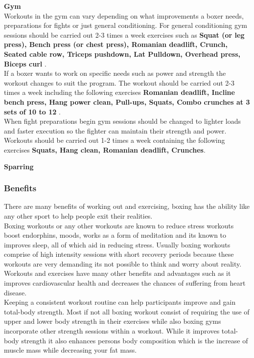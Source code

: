 \documentclass[a4paper,12pt,twoside]{report}
\begin{document}
\textbf{Gym}\\
Workouts in the gym can vary depending on what improvements a boxer needs, preparations for fights or just general conditioning.
For general conditioning gym sessions should be carried out 2-3 times a week exercises such as 
   \textbf{Squat (or leg press), Bench press (or chest press), Romanian deadlift, Crunch, Seated cable row, Triceps pushdown, Lat Pulldown, Overhead press, Biceps curl
 }.\\
If a boxer wants to work on specific needs such as power and strength the workout changes to suit the program.
The workout should be carried out 2-3 times a week including the following exercises \textbf{Romanian deadlift, Incline bench press, Hang power clean, Pull-ups, Squats, Combo crunches at 3 sets of 10 to 12
}.\\
When fight preparations begin gym sessions should be changed to lighter loads and faster execution so the fighter can maintain their strength and power.
Workouts should be carried out 1-2 times a week containing the following exercises \textbf{Squats, Hang clean, Romanian deadlift, Crunches}.\cite{gymWorkout}

\textbf{Sparring}


\subsubsection{Benefits}
There are many benefits of working out and exercising, boxing has the ability like any other sport to help people exit their realities.\\
Boxing workouts or any other workouts are known to reduce stress workouts boost endorphins,  moods, works as a form of meditation and its known to improves sleep, all of which aid in reducing stress.
Usually boxing workouts comprise of high intensity sessions with short recovery periods because these workouts are very demanding its not possible to think and worry about reality.\\
Workouts and exercises have many other benefits and advantages such as it improves cardiovascular health and decreases the chances of suffering from heart disease.\\
Keeping a consistent workout routine can help participants improve and gain total-body strength. Most if not all boxing workout consist of requiring the use of upper and lower body strength in their exercises while also boxing gyms incorporate other strength sessions within a workout. While it improves total-body strength it also enhances persons body composition which is the increase of muscle mass while decreasing your fat mass.\cite{workoutBenifits}   
\end{document}
